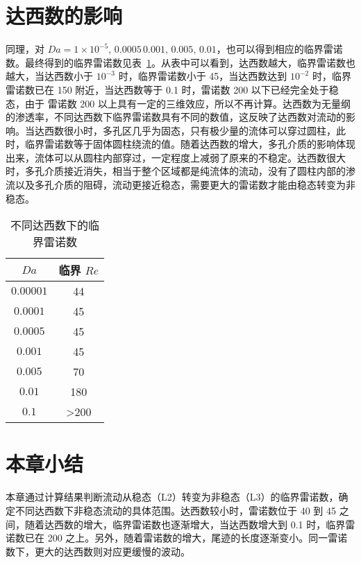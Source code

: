 \section{达西数的影响}\label{sec: Da}

同理，对 $Da=1\times 10^{-5},\,0.0005\,0.001,\,0.005,\,0.01$，也可以得到相应的临界雷诺数。最终得到的临界雷诺数见表~\ref{tab: critical Re}。从表中可以看到，达西数越大，临界雷诺数也越大，当达西数小于 $10^{-3}$ 时，临界雷诺数小于 45，当达西数达到 $10^{-2}$ 时，临界雷诺数已在 150 附近，当达西数等于 0.1 时，雷诺数 200 以下已经完全处于稳态，由于 雷诺数 200 以上具有一定的三维效应，所以不再计算。达西数为无量纲的渗透率，不同达西数下临界雷诺数具有不同的数值，这反映了达西数对流动的影响。当达西数很小时，多孔区几乎为固态，只有极少量的流体可以穿过圆柱，此时，临界雷诺数等于固体圆柱绕流的值。随着达西数的增大，多孔介质的影响体现出来，流体可以从圆柱内部穿过，一定程度上减弱了原来的不稳定。达西数很大时，多孔介质接近消失，相当于整个区域都是纯流体的流动，没有了圆柱内部的渗流以及多孔介质的阻碍，流动更接近稳态，需要更大的雷诺数才能由稳态转变为非稳态。

\begin{table}[h]
	\caption{不同达西数下的临界雷诺数}\label{tab: critical Re}
	\vspace{.5em}\centering\wuhao
	\begin{tabular}{cc}
		\toprule[1.5pt]
		$Da$ & 临界 $Re$ \\
		\midrule[1pt]
		$0.00001$ & 44 \\
		$0.0001$ & 45 \\
		$0.0005$ & 45 \\
		$0.001$  & 45 \\
		$0.005$  & 70 \\
		$0.01$   & 180 \\
		$0.1$    & >200 \\
	\bottomrule[1.5pt]
	\end{tabular}
\end{table}

\section{本章小结}

本章通过计算结果判断流动从稳态（L2）转变为非稳态（L3）的临界雷诺数，确定不同达西数下非稳态流动的具体范围。达西数较小时，雷诺数位于 40 到 45 之间，随着达西数的增大，临界雷诺数也逐渐增大，当达西数增大到 0.1 时，临界雷诺数已在 200 之上。另外，随着雷诺数的增大，尾迹的长度逐渐变小。同一雷诺数下，更大的达西数则对应更缓慢的波动。
